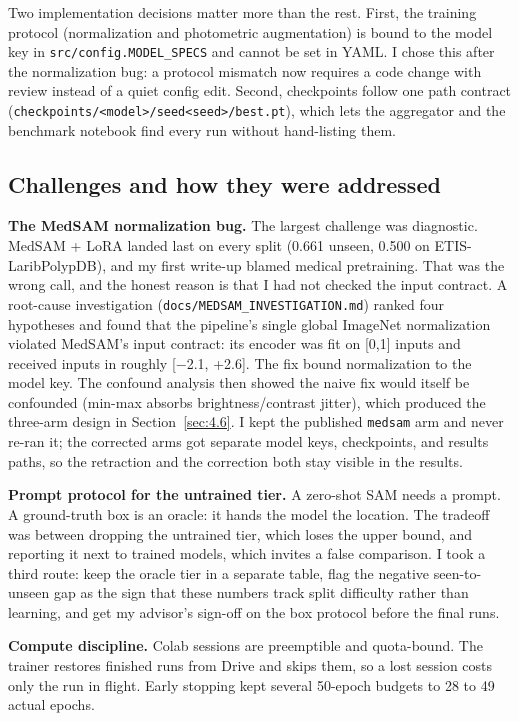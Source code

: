 \documentclass[conference]{IEEEtran}
\begin{document}
Two implementation decisions matter more than the rest. First, the training protocol (normalization and photometric augmentation) is bound to the model key in \texttt{src/config.MODEL\_SPECS} and cannot be set in YAML. I chose this after the normalization bug: a protocol mismatch now requires a code change with review instead of a quiet config edit. Second, checkpoints follow one path contract (\texttt{checkpoints/<model>/seed<seed>/best.pt}), which lets the aggregator and the benchmark notebook find every run without hand-listing them.


\subsection{Challenges and how they were addressed}\label{sec:5.2}
\textbf{The MedSAM normalization bug.} The largest challenge was diagnostic. MedSAM + LoRA landed last on every split (0.661 unseen, 0.500 on ETIS-LaribPolypDB), and my first write-up blamed medical pretraining. That was the wrong call, and the honest reason is that I had not checked the input contract. A root-cause investigation (\texttt{docs/MEDSAM\_INVESTIGATION.md}) ranked four hypotheses and found that the pipeline's single global ImageNet normalization violated MedSAM's input contract: its encoder was fit on [0,1] inputs and received inputs in roughly [$-$2.1, +2.6]. The fix bound normalization to the model key. The confound analysis then showed the naive fix would itself be confounded (min-max absorbs brightness/contrast jitter), which produced the three-arm design in Section~\ref{sec:4.6}. I kept the published \texttt{medsam} arm and never re-ran it; the corrected arms got separate model keys, checkpoints, and results paths, so the retraction and the correction both stay visible in the results.

\textbf{Prompt protocol for the untrained tier.} A zero-shot SAM needs a prompt. A ground-truth box is an oracle: it hands the model the location. The tradeoff was between dropping the untrained tier, which loses the upper bound, and reporting it next to trained models, which invites a false comparison. I took a third route: keep the oracle tier in a separate table, flag the negative seen-to-unseen gap as the sign that these numbers track split difficulty rather than learning, and get my advisor's sign-off on the box protocol before the final runs.

\textbf{Compute discipline.} Colab sessions are preemptible and quota-bound. The trainer restores finished runs from Drive and skips them, so a lost session costs only the run in flight. Early stopping kept several 50-epoch budgets to 28 to 49 actual epochs.
\end{document}
